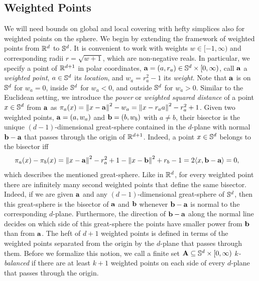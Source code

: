 \documentclass[10pt,a4paper]{article}
\newcommand {\mm}[1] {\ifmmode{#1}\else{\mbox{\(#1\)}}\fi}
\newcommand {\scalprod}[2] {{\langle #1 , #2 \rangle}}
\theoremstyle{plain}
\newcommand{\Rspace}        {\mm{{\mathbb R}}}
\newcommand{\Sspace}        {\mm{{\mathbb S}}}
\newcommand{\AAA}           {\mm{\bf A}}
\newcommand{\aaa}           {\mm{\bf a}}
\newcommand{\bbb}           {\mm{\bf b}}
\newcommand{\wdist}[2]      {\mm{\pi_{#1}{({#2})}}}
\newcommand{\Edist}[2]      {\mm{\|{#1}-{#2}\|}}
\begin{document}
\subsection{Weighted Points}
\label{sec:3.2}
We will need bounds on global and local covering with hefty simplices also for weighted points on the sphere.
We begin by extending the framework of weighted points from $\Rspace^d$ to $\Sspace^d$.
It is convenient to work with weights $w \in [-1, \infty)$ and corresponding radii $r = \sqrt{w+1}$, which are non-negative reals.
In particular, we specify a point of $\Rspace^{d+1}$ in polar coordinates, $\aaa = (a, r_a) \in \Sspace^d \times [0,\infty)$, call $\aaa$ a \emph{weighted point}, $a \in \Sspace^d$ its \emph{location}, and $w_a = r_a^2 - 1$ its \emph{weight}.
Note that $\aaa$ is on $\Sspace^d$ for $w_a = 0$, inside $\Sspace^d$ for $w_a < 0$, and outside $\Sspace^d$ for $w_a > 0$.
Similar to the Euclidean setting, we introduce the \emph{power} or \emph{weighted squared distance} of a point $x \in \Sspace^d$ from $\aaa$ as $\wdist{a}{x} = \Edist{x}{\aaa}^2 - w_a = \Edist{x}{r_a a}^2 - r_a^2 + 1$.
%
Given two weighted points, $\aaa = (a, w_a)$ and $\bbb = (b, w_b)$ with $a\neq b$, their bisector is the unique $(d-1)$-dimensional great-sphere contained in the $d$-plane with normal $\bbb - \aaa$ that passes through the origin of $\Rspace^{d+1}$.
Indeed, a point $x \in \Sspace^d$ belongs to the bisector iff
\begin{align}
  \wdist{a}{x} - \wdist{b}{x}
    &= \Edist{x}{\aaa}^2 - r_a^2 + 1 - \Edist{x}{\bbb}^2 + r_b - 1
    = 2 \scalprod{x}{\bbb - \aaa} = 0,
  \label{eqn:bisector}
\end{align}
which describes the mentioned great-sphere.
Like in $\Rspace^d$, for every weighted point there are infinitely many second weighted points that define the same bisector.
Indeed, if we are given $\aaa$ and any $(d-1)$-dimensional great-sphere of $\Sspace^d$, then this great-sphere is the bisector of $\aaa$ and $\bbb$ whenever $\bbb - \aaa$ is normal to the corresponding $d$-plane.
Furthermore, the direction of $\bbb - \aaa$ along the normal line decides on which side of this great-sphere the points have smaller power from $\bbb$ than from $\aaa$.
\smallskip
The heft of $d+1$ weighted points is defined in terms of the weighted points separated from the origin by the $d$-plane that passes through them.
Before we formalize this notion, we call a finite set $\AAA \subseteq \Sspace^d \times [0, \infty)$ \emph{$k$-balanced} if there are at least $k+1$ weighted points on each side of every $d$-plane that passes through the origin.
\end{document}
